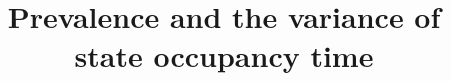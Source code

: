 \documentclass{bmcart}
\begin{document}
\begin{frontmatter}

\begin{fmbox}


\title{Prevalence and the variance of state occupancy time}


\author[
   addressref={aff1},                   %
   corref={aff1},                       %
   noteref={n1},                        %
   email={riffe@demogr.mpg.de}   %
]{ }
\author[
   addressref={aff3, aff2, aff1},
   email={williams@demogr.mpg.de }
]{ }


\address[id=aff1]{%
}
\address[id=aff2]{%
}
\address[id=aff3]{%
}


\end{fmbox}
\end{frontmatter}
\end{document}
